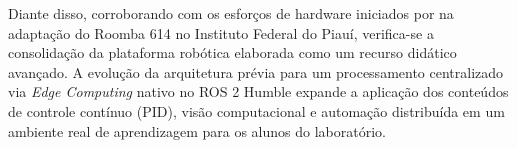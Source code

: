 Diante disso, corroborando com os esforços de hardware iniciados por  na adaptação do Roomba 614 no Instituto Federal do Piauí, verifica-se a consolidação da plataforma robótica elaborada como um recurso didático avançado. A evolução da arquitetura prévia para um processamento centralizado via \textit{Edge Computing} nativo no ROS 2 Humble expande a aplicação dos conteúdos de controle contínuo (PID), visão computacional e automação distribuída em um ambiente real de aprendizagem para os alunos do laboratório.
